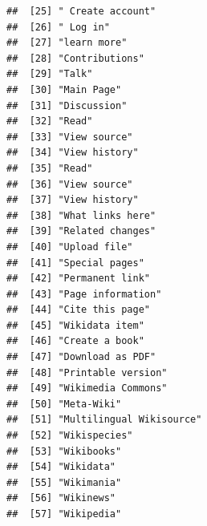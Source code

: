 \documentclass[
]{article}
\begin{document}
\begin{verbatim}
##  [25] " Create account"                                                    
##  [26] " Log in"                                                            
##  [27] "learn more"                                                         
##  [28] "Contributions"                                                      
##  [29] "Talk"                                                               
##  [30] "Main Page"                                                          
##  [31] "Discussion"                                                         
##  [32] "Read"                                                               
##  [33] "View source"                                                        
##  [34] "View history"                                                       
##  [35] "Read"                                                               
##  [36] "View source"                                                        
##  [37] "View history"                                                       
##  [38] "What links here"                                                    
##  [39] "Related changes"                                                    
##  [40] "Upload file"                                                        
##  [41] "Special pages"                                                      
##  [42] "Permanent link"                                                     
##  [43] "Page information"                                                   
##  [44] "Cite this page"                                                     
##  [45] "Wikidata item"                                                      
##  [46] "Create a book"                                                      
##  [47] "Download as PDF"                                                    
##  [48] "Printable version"                                                  
##  [49] "Wikimedia Commons"                                                  
##  [50] "Meta-Wiki"                                                          
##  [51] "Multilingual Wikisource"                                            
##  [52] "Wikispecies"                                                        
##  [53] "Wikibooks"                                                          
##  [54] "Wikidata"                                                           
##  [55] "Wikimania"                                                          
##  [56] "Wikinews"                                                           
##  [57] "Wikipedia"                                                          

\end{verbatim}
\end{document}
